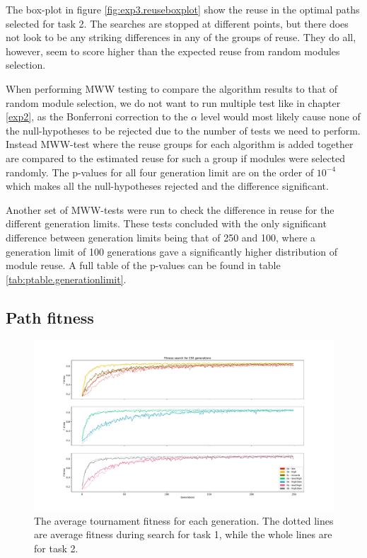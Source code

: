 The box-plot in figure \ref{fig:exp3.reuseboxplot} show the reuse in the optimal paths selected for task 2. The searches are stopped at different points, but there does not look to be any striking differences in any of the groups of reuse. They do all, however, seem to score higher than the expected reuse from random modules selection. 

When performing MWW testing to compare the algorithm results to that of random module selection, we do not want to run multiple test like in chapter \ref{exp2}, as the Bonferroni correction to the \(\alpha\) level would most likely cause none of the null-hypotheses to be rejected due to the number of tests we need to perform. Instead MWW-test where the reuse groups for each algorithm is added together are compared to the estimated reuse for such a group if modules were selected randomly. The p-values for all four generation limit are on the order of \(10^{-4}\) which makes all the null-hypotheses rejected and the difference significant. 

Another set of MWW-tests were run to check the difference in reuse for the different generation limits. These tests concluded with the only significant difference between generation limits being that of 250 and 100, where a generation limit of 100 generations gave a significantly higher distribution of module reuse. A full table of the p-values can be found in table \ref{tab:ptable.generationlimit}.

\subsection{Path fitness}
\begin{figure}
    \includegraphics[width=1.25\textwidth, center]{Chapters/4.Experiments/exp3/figures/fitness_progression.pdf}
    \caption[Changes in average tournament fitness]{The average tournament fitness for each generation. The dotted lines are average fitness during search for task 1, while the whole lines are for task 2.}
    \label{fig:exp3.fitness}
\end{figure}

